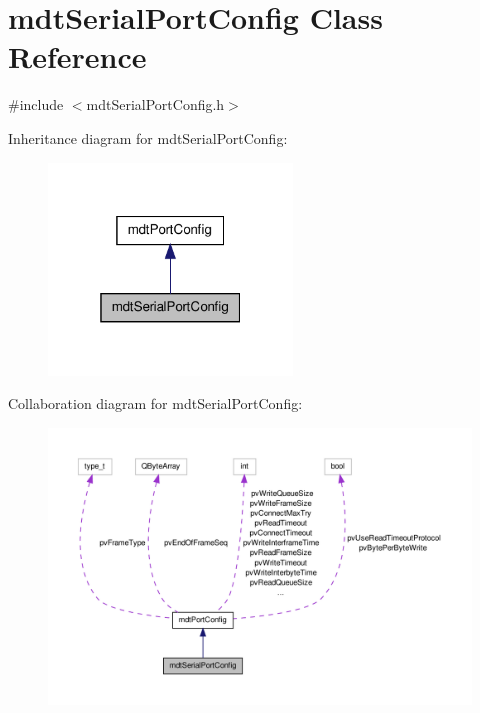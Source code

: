\hypertarget{classmdt_serial_port_config}{\section{mdt\-Serial\-Port\-Config Class Reference}
\label{classmdt_serial_port_config}
}


{\ttfamily \#include $<$mdt\-Serial\-Port\-Config.\-h$>$}



Inheritance diagram for mdt\-Serial\-Port\-Config\-:\nopagebreak
\begin{figure}[H]
\begin{center}
\leavevmode
\includegraphics[width=184pt]{classmdt_serial_port_config__inherit__graph}
\end{center}
\end{figure}


Collaboration diagram for mdt\-Serial\-Port\-Config\-:\nopagebreak
\begin{figure}[H]
\begin{center}
\leavevmode
\includegraphics[width=350pt]{classmdt_serial_port_config__coll__graph}
\end{center}
\end{figure}
